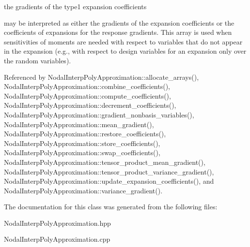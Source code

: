 the gradients of the type1 expansion coefficients 

may be interpreted as either the gradients of the expansion coefficients or the coefficients of expansions for the response gradients. This array is used when sensitivities of moments are needed with respect to variables that do not appear in the expansion (e.\+g., with respect to design variables for an expansion only over the random variables). 

Referenced by Nodal\+Interp\+Poly\+Approximation\+::allocate\+\_\+arrays(), Nodal\+Interp\+Poly\+Approximation\+::combine\+\_\+coefficients(), Nodal\+Interp\+Poly\+Approximation\+::compute\+\_\+coefficients(), Nodal\+Interp\+Poly\+Approximation\+::decrement\+\_\+coefficients(), Nodal\+Interp\+Poly\+Approximation\+::gradient\+\_\+nonbasis\+\_\+variables(), Nodal\+Interp\+Poly\+Approximation\+::mean\+\_\+gradient(), Nodal\+Interp\+Poly\+Approximation\+::restore\+\_\+coefficients(), Nodal\+Interp\+Poly\+Approximation\+::store\+\_\+coefficients(), Nodal\+Interp\+Poly\+Approximation\+::swap\+\_\+coefficients(), Nodal\+Interp\+Poly\+Approximation\+::tensor\+\_\+product\+\_\+mean\+\_\+gradient(), Nodal\+Interp\+Poly\+Approximation\+::tensor\+\_\+product\+\_\+variance\+\_\+gradient(), Nodal\+Interp\+Poly\+Approximation\+::update\+\_\+expansion\+\_\+coefficients(), and Nodal\+Interp\+Poly\+Approximation\+::variance\+\_\+gradient().



The documentation for this class was generated from the following files\+:\begin{DoxyCompactItemize}
\item 
Nodal\+Interp\+Poly\+Approximation.\+hpp\item 
Nodal\+Interp\+Poly\+Approximation.\+cpp\end{DoxyCompactItemize}
